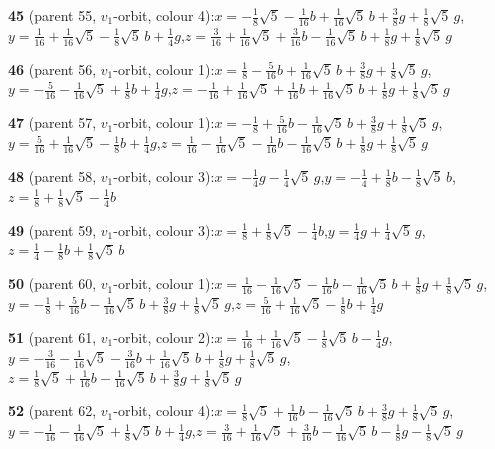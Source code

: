 \documentclass[10pt]{article}
\begin{document}
{\noindent\textbf{45} (parent 55, $v_1$-orbit, colour 4):\quad $x=-\tfrac{1}{8}\sqrt5-\tfrac{1}{16}b+\tfrac{1}{16}\sqrt5\,b+\tfrac{3}{8}g+\tfrac{1}{8}\sqrt5\,g$,\quad $y=\tfrac{1}{16}+\tfrac{1}{16}\sqrt5-\tfrac{1}{8}\sqrt5\,b+\tfrac{1}{4}g$,\quad $z=\tfrac{3}{16}+\tfrac{1}{16}\sqrt5+\tfrac{3}{16}b-\tfrac{1}{16}\sqrt5\,b+\tfrac{1}{8}g+\tfrac{1}{8}\sqrt5\,g$\par\smallskip
\noindent\textbf{46} (parent 56, $v_1$-orbit, colour 1):\quad $x=\tfrac{1}{8}-\tfrac{5}{16}b+\tfrac{1}{16}\sqrt5\,b+\tfrac{3}{8}g+\tfrac{1}{8}\sqrt5\,g$,\quad $y=-\tfrac{5}{16}-\tfrac{1}{16}\sqrt5+\tfrac{1}{8}b+\tfrac{1}{4}g$,\quad $z=-\tfrac{1}{16}+\tfrac{1}{16}\sqrt5+\tfrac{1}{16}b+\tfrac{1}{16}\sqrt5\,b+\tfrac{1}{8}g+\tfrac{1}{8}\sqrt5\,g$\par\smallskip
\noindent\textbf{47} (parent 57, $v_1$-orbit, colour 1):\quad $x=-\tfrac{1}{8}+\tfrac{5}{16}b-\tfrac{1}{16}\sqrt5\,b+\tfrac{3}{8}g+\tfrac{1}{8}\sqrt5\,g$,\quad $y=\tfrac{5}{16}+\tfrac{1}{16}\sqrt5-\tfrac{1}{8}b+\tfrac{1}{4}g$,\quad $z=\tfrac{1}{16}-\tfrac{1}{16}\sqrt5-\tfrac{1}{16}b-\tfrac{1}{16}\sqrt5\,b+\tfrac{1}{8}g+\tfrac{1}{8}\sqrt5\,g$\par\smallskip
\noindent\textbf{48} (parent 58, $v_1$-orbit, colour 3):\quad $x=-\tfrac{1}{4}g-\tfrac{1}{4}\sqrt5\,g$,\quad $y=-\tfrac{1}{4}+\tfrac{1}{8}b-\tfrac{1}{8}\sqrt5\,b$,\quad $z=\tfrac{1}{8}+\tfrac{1}{8}\sqrt5-\tfrac{1}{4}b$\par\smallskip
\noindent\textbf{49} (parent 59, $v_1$-orbit, colour 3):\quad $x=\tfrac{1}{8}+\tfrac{1}{8}\sqrt5-\tfrac{1}{4}b$,\quad $y=\tfrac{1}{4}g+\tfrac{1}{4}\sqrt5\,g$,\quad $z=\tfrac{1}{4}-\tfrac{1}{8}b+\tfrac{1}{8}\sqrt5\,b$\par\smallskip
\noindent\textbf{50} (parent 60, $v_1$-orbit, colour 1):\quad $x=\tfrac{1}{16}-\tfrac{1}{16}\sqrt5-\tfrac{1}{16}b-\tfrac{1}{16}\sqrt5\,b+\tfrac{1}{8}g+\tfrac{1}{8}\sqrt5\,g$,\quad $y=-\tfrac{1}{8}+\tfrac{5}{16}b-\tfrac{1}{16}\sqrt5\,b+\tfrac{3}{8}g+\tfrac{1}{8}\sqrt5\,g$,\quad $z=\tfrac{5}{16}+\tfrac{1}{16}\sqrt5-\tfrac{1}{8}b+\tfrac{1}{4}g$\par\smallskip
\noindent\textbf{51} (parent 61, $v_1$-orbit, colour 2):\quad $x=\tfrac{1}{16}+\tfrac{1}{16}\sqrt5-\tfrac{1}{8}\sqrt5\,b-\tfrac{1}{4}g$,\quad $y=-\tfrac{3}{16}-\tfrac{1}{16}\sqrt5-\tfrac{3}{16}b+\tfrac{1}{16}\sqrt5\,b+\tfrac{1}{8}g+\tfrac{1}{8}\sqrt5\,g$,\quad $z=\tfrac{1}{8}\sqrt5+\tfrac{1}{16}b-\tfrac{1}{16}\sqrt5\,b+\tfrac{3}{8}g+\tfrac{1}{8}\sqrt5\,g$\par\smallskip
\noindent\textbf{52} (parent 62, $v_1$-orbit, colour 4):\quad $x=\tfrac{1}{8}\sqrt5+\tfrac{1}{16}b-\tfrac{1}{16}\sqrt5\,b+\tfrac{3}{8}g+\tfrac{1}{8}\sqrt5\,g$,\quad $y=-\tfrac{1}{16}-\tfrac{1}{16}\sqrt5+\tfrac{1}{8}\sqrt5\,b+\tfrac{1}{4}g$,\quad $z=\tfrac{3}{16}+\tfrac{1}{16}\sqrt5+\tfrac{3}{16}b-\tfrac{1}{16}\sqrt5\,b-\tfrac{1}{8}g-\tfrac{1}{8}\sqrt5\,g$\par\smallskip
}
\end{document}
